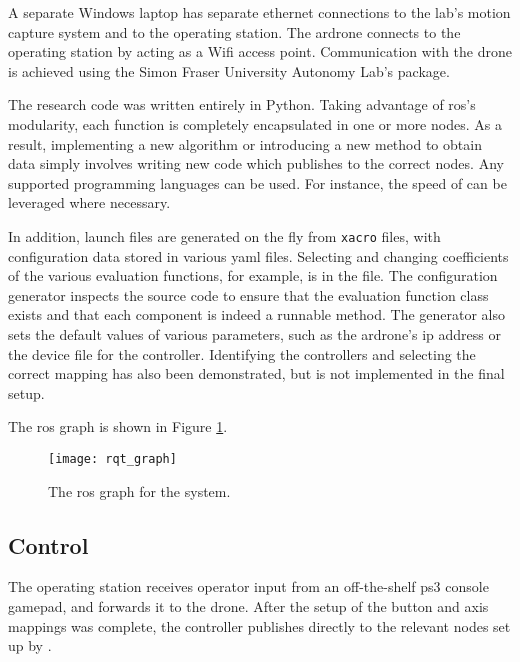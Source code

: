     A separate Windows laptop has separate ethernet connections to the lab's motion capture system and to the operating station.
    The \gls{ardrone} connects to the operating station by acting as a Wifi access point.
    Communication with the drone is achieved using the Simon Fraser University Autonomy Lab's \texttt{} package.

    The research code was written entirely in Python.
    Taking advantage of \gls{ros}'s modularity, each function is completely encapsulated in one or more nodes.
    As a result, implementing a new algorithm or introducing a new method to obtain data simply involves writing new code which publishes to the correct nodes.
    Any supported programming languages can be used.
    For instance, the speed of \cpp can be leveraged where necessary.
    
    In addition, launch files are generated on the fly from \texttt{xacro} files, with configuration data stored in various \gls{yaml} files.
    Selecting and changing coefficients of the various evaluation functions, for example, is in the \texttt{} file.
    The configuration generator inspects the source code to ensure that the evaluation function class exists and that each component is indeed a runnable method.
    The generator also sets the default values of various parameters, such as the \gls{ardrone}'s \gls{ip} address or the device file for the controller.
    Identifying the controllers and selecting the correct mapping has also been demonstrated, but is not implemented in the final setup.

    The \gls{ros} graph is shown in Figure \ref{fig:rqt_graph}.
    \begin{figure}[h]
      \centering
      \texttt{[image: rqt\_graph]}
      \caption[ROS Graph]{The \gls{ros} graph for the system.}
      \label{fig:rqt_graph}
    \end{figure}

  \subsection{Control}
    The operating station receives operator input from an off-the-shelf \gls{ps3} console gamepad, and forwards it to the drone.
    After the setup of the button and axis mappings was complete, the controller publishes directly to the relevant \texttt{} nodes set up by \texttt{}.

